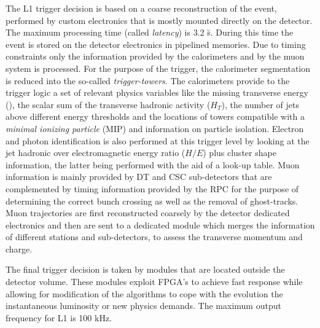 The L1 trigger decision is based on a coarse reconstruction of the event, performed by custom electronics that is mostly mounted directly on the detector. 
The maximum processing time (called \emph{latency}) is 3.2 \u s. 
During this time the event is stored on the detector electronics in pipelined memories. 
Due to timing constraints only the information provided by the calorimeters and by the muon system is processed. 
For the purpose of the trigger, the calorimeter segmentation is reduced into the so-called \emph{trigger-towers}. 
The calorimeters provide to the trigger logic a set of relevant physics variables like the missing transverse energy (\MET), the scalar sum of the transverse hadronic activity ($H_T$), the number of jets above different energy thresholds and the locations of towers compatible with a \emph{minimal ionizing particle} (MIP) and information on particle isolation. 
Electron and photon identification is also performed at this trigger level by looking at the jet hadronic over electromagnetic energy ratio ($H/E$) plus cluster shape information, the latter being performed with the aid of a look-up table. 
Muon information is mainly provided by DT and CSC sub-detectors that are complemented by timing information provided by the RPC for the purpose of determining the correct bunch crossing as well as the removal of ghost-tracks. 
Muon trajectories are first reconstructed coarsely by the detector dedicated electronics and then are sent to a dedicated module which merges the information of different stations and sub-detectors, to assess the transverse momentum  and charge. 

The final trigger decision is taken by modules that are located outside the detector volume. These modules exploit FPGA's to achieve fast response while allowing for modification of the algorithms to cope with the evolution the instantaneous luminosity or new physics demands. The maximum output frequency for L1 is 100 kHz.

